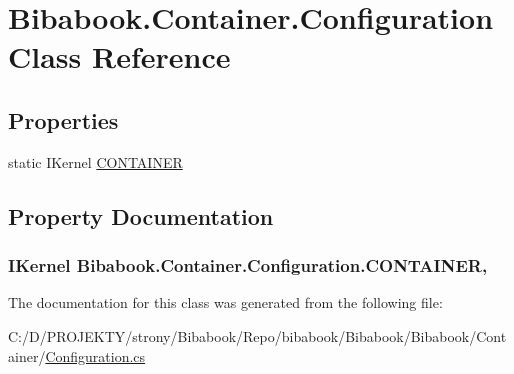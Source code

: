 \hypertarget{class_bibabook_1_1_container_1_1_configuration}{}\section{Bibabook.\+Container.\+Configuration Class Reference}
\label{class_bibabook_1_1_container_1_1_configuration}
\subsection*{Properties}
\begin{DoxyCompactItemize}
\item 
static I\+Kernel \hyperlink{class_bibabook_1_1_container_1_1_configuration_ac0314895703947d16562b4a34181ba35}{C\+O\+N\+T\+A\+I\+N\+E\+R}
\end{DoxyCompactItemize}


\subsection{Property Documentation}
\hypertarget{class_bibabook_1_1_container_1_1_configuration_ac0314895703947d16562b4a34181ba35}{}
\subsubsection[{C\+O\+N\+T\+A\+I\+N\+E\+R}]{\setlength{\rightskip}{0pt plus 5cm}I\+Kernel Bibabook.\+Container.\+Configuration.\+C\+O\+N\+T\+A\+I\+N\+E\+R\hspace{0.3cm}{\ttfamily [static]}, {\ttfamily [get]}}\label{class_bibabook_1_1_container_1_1_configuration_ac0314895703947d16562b4a34181ba35}


The documentation for this class was generated from the following file\+:\begin{DoxyCompactItemize}
\item 
C\+:/\+D/\+P\+R\+O\+J\+E\+K\+T\+Y/strony/\+Bibabook/\+Repo/bibabook/\+Bibabook/\+Bibabook/\+Container/\hyperlink{_configuration_8cs}{Configuration.\+cs}\end{DoxyCompactItemize}
